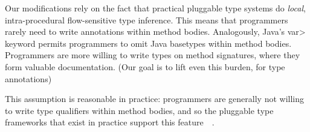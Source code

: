 Our modifications rely on the fact that practical pluggable type systems
do \emph{local}, intra-procedural flow-sensitive type inference.
This means that programmers rarely need to write annotations within method bodies.
Analogously, Java's \<var> keyword permits programmers to omit Java basetypes within
method bodies.
Programmers are more willing to write types on method
signatures, where they form valuable documentation.  (Our goal is to lift
even this burden, for type annotations)

This assumption is
reasonable in practice: programmers are generally not willing to
write type qualifiers within method bodies, and so 
the pluggable type frameworks that exist in practice 
support this feature~\cite{PapiACPE2008}~.  

